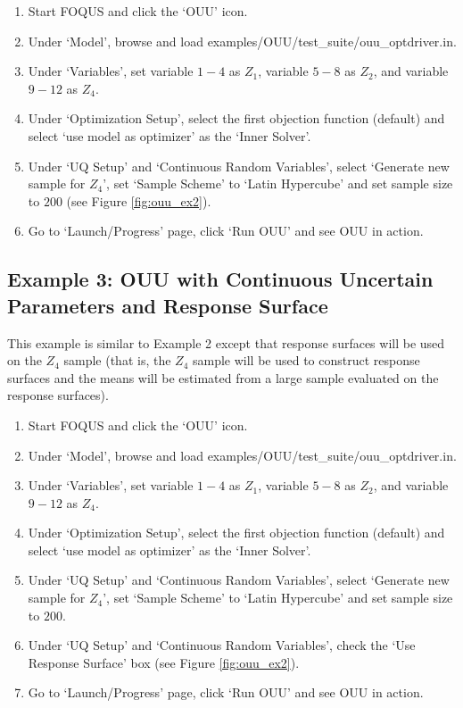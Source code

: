 \begin{enumerate}
\item Start FOQUS and click the `OUU' icon.
\item Under `Model', browse and load {\sf examples/OUU/test\_suite/ouu\_optdriver.in}.
\item Under `Variables', set variable $1-4$ as $Z_1$, variable $5-8$ as $Z_2$, and
      variable $9-12$ as $Z_4$.
\item Under `Optimization Setup', select the first objection function (default)
      and select `use model as optimizer' as the `Inner Solver'.
\item Under `UQ Setup' and `Continuous Random Variables', select 
      `Generate new sample for $Z_4$', set `Sample Scheme'
      to `Latin Hypercube' and set sample size to $200$ (see Figure \ref{fig:ouu_ex2}).
\item Go to `Launch/Progress' page, click `Run OUU' and see OUU in action.
\end{enumerate}

\subsection{Example 3: OUU with Continuous Uncertain Parameters and Response Surface}

This example is similar to Example 2 except that response surfaces will be used
on the $Z_4$ sample (that is, the $Z_4$ sample will be used to construct response
surfaces and the means will be estimated from a large sample evaluated on the
response surfaces).

\begin{enumerate}
\item Start FOQUS and click the `OUU' icon.
\item Under `Model', browse and load {\sf examples/OUU/test\_suite/ouu\_optdriver.in}.
\item Under `Variables', set variable $1-4$ as $Z_1$, variable $5-8$ as $Z_2$, and
      variable $9-12$ as $Z_4$.
\item Under `Optimization Setup', select the first objection function (default)
      and select `use model as optimizer' as the `Inner Solver'.
\item Under `UQ Setup' and `Continuous Random Variables', select 
      `Generate new sample for $Z_4$', set `Sample Scheme'
      to `Latin Hypercube' and set sample size to $200$.
\item Under `UQ Setup' and `Continuous Random Variables', check the 
      `Use Response Surface' box (see Figure \ref{fig:ouu_ex2}).
\item Go to `Launch/Progress' page, click `Run OUU' and see OUU in action.
\end{enumerate}

